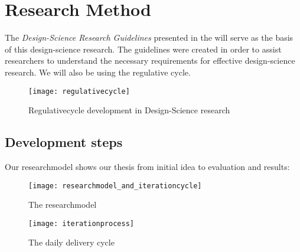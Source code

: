 %
%
\section{Research Method}


The \emph{Design-Science Research Guidelines} presented in \cite{Esearch2004} the  will serve as the basis of this design-science research. The guidelines were created in order to assist researchers to understand the necessary requirements for effective design-science research. We will also be using the regulative cycle\cite{wieringa}.
\begin{figure}[!htpb]
\label{regulativecycle}
\centering
	\texttt{[image: regulativecycle]}
\caption{Regulativecycle development in Design-Science research}
\end{figure}

\subsection{Development steps}
Our researchmodel shows our thesis from initial idea to evaluation and results:

\begin{figure}[!htpb]
\label{researchmodel}
\centering
	\texttt{[image: researchmodel\_and\_iterationcycle]}
\caption{The researchmodel}
\end{figure}

\begin{figure}[!htpb]
\label{iterationprocess}
\centering
	\texttt{[image: iterationprocess]}
\caption{The daily delivery cycle}
\end{figure}



